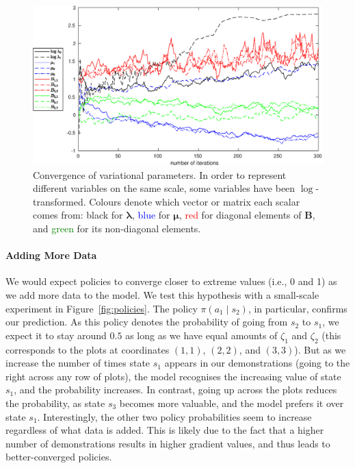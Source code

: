 \documentclass{mpaper}
\newcommand{\pitwo}{\pi(a_1 \mid s_2)}
\begin{document}
\begin{figure}
  \centering
  \includegraphics[width=\textwidth]{figures/parameter_convergence_new}
  \caption{Convergence of variational parameters. In order to represent
    different variables on the same scale, some variables have been
    $\log$-transformed. Colours denote which vector or matrix each scalar comes
    from: black for $\bm\lambda$, \textcolor{blue}{blue} for $\bm\mu$,
    \textcolor{red}{red} for diagonal elements of $\mathbf{B}$, and
    \textcolor{green}{green} for its non-diagonal elements.}
  \label{fig:convergence2}
\end{figure}

\paragraph{Adding More Data}

We would expect policies to converge closer to extreme values (i.e., 0 and 1) as
we add more data to the model. We test this hypothesis with a small-scale
experiment in Figure~\ref{fig:policies}. The policy $\pitwo$, in particular,
confirms our prediction. As this policy denotes the probability of going from
$s_2$ to $s_1$, we expect it to stay around $0.5$ as long as we have equal
amounts of $\zeta_1$ and $\zeta_2$ (this corresponds to the plots at coordinates
$(1, 1)$, $(2, 2)$, and $(3, 3)$). But as we increase the number of times state
$s_1$ appears in our demonstrations (going to the right across any row of
plots), the model recognises the increasing value of state $s_1$, and the
probability increases. In contrast, going up across the plots reduces the
probability, as state $s_3$ becomes more valuable, and the model prefers it over
state $s_1$. Interestingly, the other two policy probabilities seem to increase
regardless of what data is added. This is likely due to the fact that a higher
number of demonstrations results in higher gradient values, and thus leads to
better-converged policies.
\end{document}
